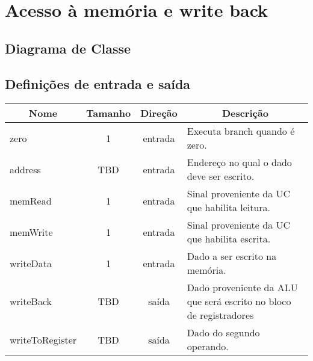 \section{Acesso à memória e write back}
	\subsection{Diagrama de Classe}
  \begin{figure}[H]
    
  \end{figure}

\subsection{Definições de entrada e saída}

	\begin{center}
        \begin{longtable}[pos]{| l | c | c | m{7cm} |} \hline
          \multicolumn{1}{|c|}{\cellcolor[gray]{0.9}\textbf{Nome}} & 
          \multicolumn{1}{c|}{\cellcolor[gray]{0.9}\textbf{Tamanho}} & 
          \multicolumn{1}{c|}{\cellcolor[gray]{0.9}\textbf{Direção}} &
          \multicolumn{1}{c|}{\cellcolor[gray]{0.9}\textbf{Descrição}} \\ \hline
          \endhead
          \hline
          \endlastfoot

          zero          	       & 1   & entrada   & Executa branch quando é zero.    \\ \hline
          address                  & TBD & entrada   & Endereço no qual o dado deve ser escrito.    \\ \hline
          memRead                  & 1   & entrada   & Sinal proveniente da UC que habilita leitura.    \\ \hline
          memWrite                 & 1   & entrada   & Sinal proveniente da UC que habilita escrita.    \\ \hline
          writeData      		   & 1   & entrada   & Dado a ser escrito na memória. \\ \hline
          writeBack	               & TBD & saída     & Dado proveniente da ALU que será escrito no bloco de registradores\\ \hline
          writeToRegister          & TBD & saída     & Dado do segundo operando.    \\
        \end{longtable}
      \end{center}